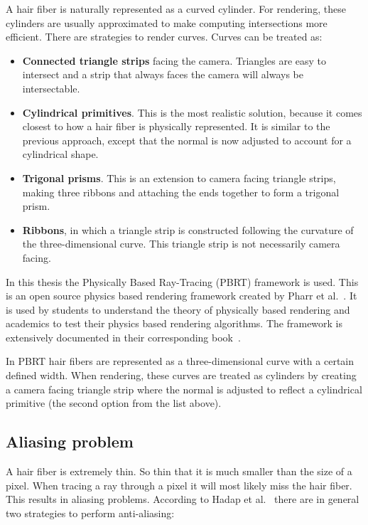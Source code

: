 \documentclass[11pt,a4paper]{report}
\begin{document}
A hair fiber is naturally represented as a curved cylinder. For rendering, these cylinders are usually approximated to make computing intersections more efficient. There are strategies to render curves. Curves can be treated as:

\begin{itemize}
\item \textbf{Connected triangle strips} facing the camera. Triangles are easy to intersect and a strip that always faces the camera will always be intersectable.

\item \textbf{Cylindrical primitives}. This is the most realistic solution, because it comes closest to how a hair fiber is physically represented. It is similar to the previous approach, except that the normal is now adjusted to account for a cylindrical shape.

\item \textbf{Trigonal prisms}. This is an extension to camera facing triangle strips, making three ribbons and attaching the ends together to form a trigonal prism.

\item \textbf{Ribbons}, in which a triangle strip is constructed following the curvature of the three-dimensional curve. This triangle strip is not necessarily camera facing.

\end{itemize}

In this thesis the Physically Based Ray-Tracing (PBRT) framework is used. This is an open source physics based rendering framework created by Pharr et al.~\cite{pharr2017}. It is used by students to understand the theory of physically based rendering and academics to test their physics based rendering algorithms. The framework is extensively documented in their corresponding book~\cite{pharr2017}.

In PBRT hair fibers are represented as a three-dimensional curve with a certain defined width. When rendering, these curves are treated as cylinders by creating a camera facing triangle strip where the normal is adjusted to reflect a cylindrical primitive (the second option from the list above).

\subsection{Aliasing problem}

A hair fiber is extremely thin. So thin that it is much smaller than the size of a pixel. When tracing a ray through a pixel it will most likely miss the hair fiber. This results in aliasing problems. According to Hadap et al.~\cite{hadap} there are in general two strategies to perform anti-aliasing:
\end{document}
